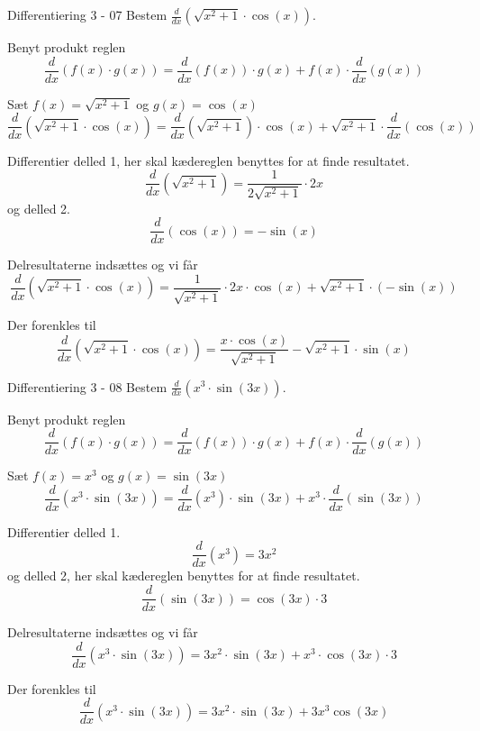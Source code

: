 \documentclass{article}
\begin{document}
\begin{exercise}{Differentiering 3 - 07}
	Bestem $\frac{d}{dx} \left( \sqrt{x^2+1} \cdot \cos(x) \right)$.
	
	
	\hint
	Benyt produkt reglen
	\[
	\frac{d}{dx} \left( f(x) \cdot g(x) \right) = \frac{d}{dx} \left( f(x) \right) \cdot g(x) + f(x) \cdot \frac{d}{dx} \left( g(x) \right)
	\]
	
	\hint
	Sæt $f(x) = \sqrt{x^2 + 1}$ og $g(x) = \cos(x)$
	\[
	\frac{d}{dx} \left(  \sqrt{x^2+1} \cdot \cos(x) \right) = \frac{d}{dx} \left( \sqrt{x^2 + 1}\right) \cdot \cos(x) + \sqrt{x^2 + 1} \cdot \frac{d}{dx} \left( \cos(x) \right)
	\]
	
	\hint
	Differentier delled 1, her skal kædereglen benyttes for at finde resultatet.
	\[
	\frac{d}{dx} \left( \sqrt{x^2 + 1 }\right) = \frac{1}{2 \sqrt{x^2 + 1}} \cdot 2x  
	\]
	og delled 2.
	\[
	\frac{d}{dx} \left( \cos(x) \right) = -\sin(x)
	\]
	
	
	\hint
	Delresultaterne indsættes og vi får
	\[
	\frac{d}{dx} \left( \sqrt{x^2+1} \cdot \cos(x) \right) = \frac{1}{\sqrt{x^2 + 1}} \cdot 2x \cdot \cos(x) +  \sqrt{x^2 + 1} \cdot (-\sin(x)) 
	\]
	
	\hint
	Der forenkles til 
	\[
	\frac{d}{dx} \left( \sqrt{x^2+1} \cdot \cos(x)\right) = \frac{x \cdot \cos(x)}{\sqrt{x^2 + 1}} - \sqrt{x^2 + 1 } \cdot \sin(x)
	\]
	
\end{exercise}


\begin{exercise}{Differentiering 3 - 08}
	Bestem $\frac{d}{dx} \left( x^3 \cdot \sin(3x) \right)$.
	
	
	\hint
	Benyt produkt reglen
	\[
	\frac{d}{dx} \left( f(x) \cdot g(x) \right) = \frac{d}{dx} \left( f(x) \right) \cdot g(x) + f(x) \cdot \frac{d}{dx} \left( g(x) \right)
	\]
	
	\hint
	Sæt $f(x) = x^3$ og $g(x) = \sin(3x)$
	\[
	\frac{d}{dx} \left( x^3 \cdot \sin(3x) \right) = \frac{d}{dx} \left( x^3 \right) \cdot \sin(3x) + x^3 \cdot \frac{d}{dx} \left( \sin(3x)\right)
	\]
	
	\hint
	Differentier delled 1.
	\[
	\frac{d}{dx} \left( x^3 \right) = 3x^2
	\]
	og delled 2, her skal kædereglen benyttes for at finde resultatet.
	\[
	\frac{d}{dx} \left( \sin(3x) \right) = \cos(3x) \cdot 3
	\]
	
	
	\hint
	Delresultaterne indsættes og vi får
	\[
	\frac{d}{dx} \left( x^3 \cdot \sin(3x) \right) = 3x^2 \cdot \sin(3x) + x^3 \cdot \cos(3x) \cdot 3
	\]
	
	\hint
	Der forenkles til 
	\[
	\frac{d}{dx} \left( x^3 \cdot \sin(3x) \right) = 3x^2 \cdot \sin(3x) + 3x^3 \cos(3x) 
	\]
	
\end{exercise}
\end{document}
